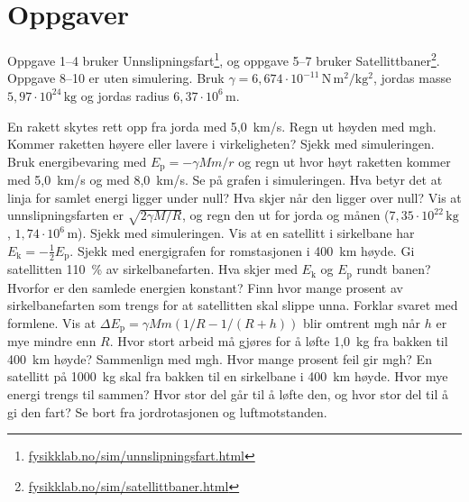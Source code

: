 \documentclass[11pt]{article}
\begin{document}

\section*{Oppgaver}

Oppgave 1–4 bruker Unnslipningsfart\footnote{\url{fysikklab.no/sim/unnslipningsfart.html}}, og oppgave 5–7 bruker Satellittbaner\footnote{\url{fysikklab.no/sim/satellittbaner.html}}. Oppgave 8–10 er uten simulering. Bruk $γ = 6{,}674 \cdot 10^{-11}\,\mathrm{N\,m^{2}/kg^{2}}$, jordas masse $5{,}97 \cdot 10^{24}\,\mathrm{kg}$ og jordas radius $6{,}37 \cdot 10^{6}\,\mathrm{m}$.

\begin{oppgaveliste}
\oppgave {}En rakett skytes rett opp fra jorda med 5,0~km/s. Regn ut høyden med mgh. Kommer raketten høyere eller lavere i virkeligheten? Sjekk med simuleringen.
\svar
\oppgave {}Bruk energibevaring med $E_{\mathrm{p}} = -γMm/r$ og regn ut hvor høyt raketten kommer med 5,0~km/s og med 8,0~km/s.
\svar
\oppgave {}Se på grafen i simuleringen. Hva betyr det at linja for samlet energi ligger under null? Hva skjer når den ligger over null?
\svar
\oppgave {}Vis at unnslipningsfarten er $\sqrt{2γM/R}$, og regn den ut for jorda og månen ($7{,}35 \cdot 10^{22}\,\mathrm{kg}$, $1{,}74 \cdot 10^{6}\,\mathrm{m}$). Sjekk med simuleringen.
\svar
\oppgave {}Vis at en satellitt i sirkelbane har $E_{\mathrm{k}} = -\tfrac{1}{2}E_{\mathrm{p}}$. Sjekk med energigrafen for romstasjonen i 400~km høyde.
\svar
\oppgave {}Gi satellitten 110~\% av sirkelbanefarten. Hva skjer med $E_{\mathrm{k}}$ og $E_{\mathrm{p}}$ rundt banen? Hvorfor er den samlede energien konstant?
\svar
\oppgave {}Finn hvor mange prosent av sirkelbanefarten som trengs for at satellitten skal slippe unna. Forklar svaret med formlene.
\svar
\oppgave {}Vis at $ΔE_{\mathrm{p}} = γMm(1/R - 1/(R + h))$ blir omtrent mgh når $h$ er mye mindre enn $R$.
\svar
\oppgave {}Hvor stort arbeid må gjøres for å løfte 1,0~kg fra bakken til 400~km høyde? Sammenlign med mgh. Hvor mange prosent feil gir mgh?
\svar
\oppgave {}En satellitt på 1000~kg skal fra bakken til en sirkelbane i 400~km høyde. Hvor mye energi trengs til sammen? Hvor stor del går til å løfte den, og hvor stor del til å gi den fart? Se bort fra jordrotasjonen og luftmotstanden.
\svar
\end{oppgaveliste}
\end{document}
